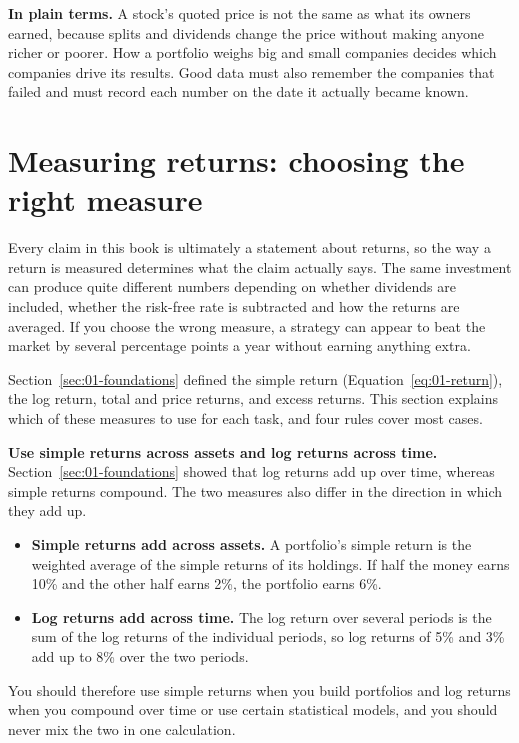 \noindent\textbf{In plain terms.} A stock's quoted price is not the same as what its owners earned, because splits and dividends change the price without making anyone richer or poorer. How a portfolio weighs big and small companies decides which companies drive its results. Good data must also remember the companies that failed and must record each number on the date it actually became known.

\section{Measuring returns: choosing the right measure}
\label{sec:02-returns}

Every claim in this book is ultimately a statement about returns, so the way a return is measured determines what the claim actually says. The same investment can produce quite different numbers depending on whether dividends are included, whether the risk-free rate is subtracted and how the returns are averaged. If you choose the wrong measure, a strategy can appear to beat the market by several percentage points a year without earning anything extra.

Section~\ref{sec:01-foundations} defined the simple return (Equation~\eqref{eq:01-return}), the log return, total and price returns, and excess returns. This section explains which of these measures to use for each task, and four rules cover most cases.

\textbf{Use simple returns across assets and log returns across time.} Section~\ref{sec:01-foundations} showed that log returns add up over time, whereas simple returns compound. The two measures also differ in the direction in which they add up.

\begin{itemize}
  \item \textbf{Simple returns add across assets.} A portfolio's simple return is the weighted average of the simple returns of its holdings. If half the money earns 10\% and the other half earns 2\%, the portfolio earns 6\%.
  \item \textbf{Log returns add across time.} The log return over several periods is the sum of the log returns of the individual periods, so log returns of 5\% and 3\% add up to 8\% over the two periods.
\end{itemize}

You should therefore use simple returns when you build portfolios and log returns when you compound over time or use certain statistical models, and you should never mix the two in one calculation.

